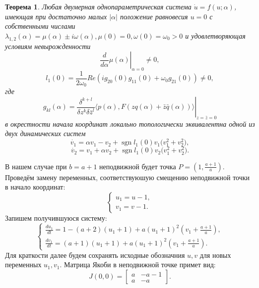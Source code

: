 \documentclass[12pt]{article}
\newtheorem{theorem}{Теорема}
\DeclareMathOperator{\sgn}{sgn}
\begin{document}
\begin{theorem}
    Любая двумерная однопараметрическая система $\dot{u} = f(u;\alpha)$, имеющая при достаточно малых $|\alpha|$ положение равновесия $u = 0$ с собственными числами $\lambda_{1,2}(\alpha) = \mu(\alpha) \pm i\omega(\alpha), \mu(0) = 0, \omega(0) = \omega_0 > 0$ и удовлетворяющая условиям невырожденности
    \begin{equation}
        \left.\frac{d}{d\alpha}\mu(\alpha)\right\vert_{\alpha = 0} \neq 0,
    \end{equation}
    \begin{equation}
        l_1(0) = \frac{1}{2\omega_0}Re(ig_{20}(0)g_{11}(0)+\omega_0g_{21}(0)) \neq 0,
    \end{equation}
    где
    $$
        g_{kl}(\alpha) = \left.\frac{\delta^{k+l}}{\delta z^k \delta \bar{z}^{l}} \langle p(\alpha), F(zq(\alpha) + \bar{z}\bar{q}(\alpha)) \rangle\right\vert_{z=\bar{z}=0}
    $$
    в окрестности начала координат локально топологически эквивалентна одной из двух динамических систем
    $$
        \dot{v_1} = \alpha v_1 - v_2 + \sgn{l_1(0) v_1(v_{1}^{2}+v_{2}^{2}}),
    $$
    $$
        \dot{v_2} = v_1 + \alpha v_2 + \sgn{l_1(0) v_2(v_{1}^{2}+v_{2}^{2}}).
    $$
\end{theorem}
В нашем случае при $b = a + 1$ неподвижной будет точка $P = \left(1, \frac{a+1}{a}\right)$. Проведём замену переменных, соответствуюшую смещению неподвижной точки в начало координат:
\begin{equation}
    \begin{cases}
        u_1 = u - 1,\\
        v_1 = v - 1.
    \end{cases}
\end{equation}
Запишем получившуюся систему:
\begin{equation}
    \begin{cases}
        \frac{du_1}{dt} = 1 - (a+2)(u_1 + 1) + a(u_1 + 1)^2\left(v_1 + \frac{a+1}{a}\right),\\
        \frac{dv_1}{dt} = (a+1)(u_1 + 1) + a(u_1 + 1)^2\left(v_1 + \frac{a+1}{a}\right).
    \end{cases}
\end{equation}
Для краткости далее будем сохранять исходные обозначния $u, v$ для новых переменных $u_1, v_1$. Матрица Якоби в неподвижной точке примет вид:
\begin{equation}
    J(0, 0) =
    \begin{bmatrix}
        a & -a - 1 \\
        a & -a
    \end{bmatrix}.
\end{equation}
\end{document}
